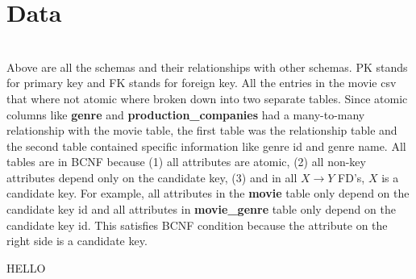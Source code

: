 \documentclass[11pt]{article}
\begin{document}
\section{Data}

	\vspace{2cm}\\

	Above are all the schemas and their relationships with other schemas.
	PK stands for primary key and FK stands for foreign key. All the entries
	in the movie csv that where not atomic where broken down into
	two separate tables. Since atomic columns like \textbf{genre} and
	\textbf{production\_companies} had a many-to-many relationship with the
	movie table, the first table was the relationship table and the
	second table contained specific information like genre id and genre name.
	All tables are in BCNF because (1) all attributes are atomic, (2) all
	non-key attributes depend only on the candidate key, (3)
	and in all $X \rightarrow Y$ FD's, $X$ is a candidate key. For example,
	all attributes in the \textbf{movie} table only depend on the candidate key id
	and all attributes in  \textbf{movie\_genre} table only depend on the candidate
	key id. This satisfies BCNF condition because the attribute on the right
	side is a candidate key.

\pagebreak
HELLO
\pagebreak
\end{document}
